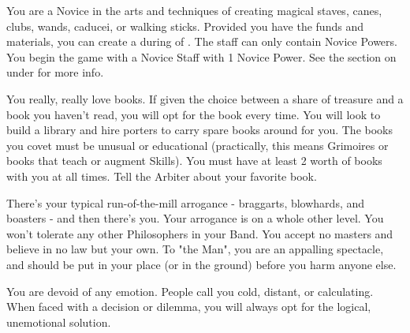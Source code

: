 \begin{multicols*}{2}
  You are a Novice in the arts and techniques of creating magical staves, canes, clubs, wands, caducei, or walking sticks. Provided you have the funds and materials, you can create a  during  of . The staff can only contain Novice Powers. You begin the game with a Novice Staff with 1 Novice Power. See the section on  under  for more info.

\cbreak



    \begin{center}
    \end{center}



  You really, really love books. If given the choice between a share of treasure and a book you haven't read, you will opt for the book every time. You will look to build a library and hire porters to carry spare books around for you. The books you covet must be unusual or educational (practically, this means Grimoires or books that teach or augment Skills). You must have at least 2  worth of books with you at all times. Tell the Arbiter about your favorite book.


  There's your typical run-of-the-mill arrogance - braggarts, blowhards, and boasters - and then there's you. Your arrogance is on a whole other level. You won't tolerate any other Philosophers in your Band. You accept no masters and believe in no law but your own. To "the Man", you are an appalling spectacle, and should be put in your place (or in the ground) before you harm anyone else.


  You are devoid of any emotion. People call you cold, distant, or calculating. When faced with a decision or dilemma, you will always opt for the logical, unemotional solution.




\end{multicols*}
